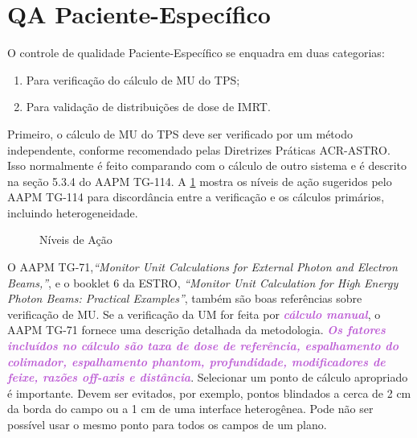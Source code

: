 \documentclass[11pt,a4paper]{article}
\newcounter{exemplo}
\begin{document}
\section{QA Paciente-Específico}

	O controle de qualidade Paciente-Específico se enquadra em duas categorias:

	\begin{enumerate}[label=\textcolor{CarnationPink}{\roman*.}]
		\item Para verificação do cálculo de MU do TPS;
		\item Para validação de distribuições de dose de IMRT.
	\end{enumerate}

	Primeiro, o cálculo de MU do TPS deve ser verificado por um método independente, conforme recomendado pelas Diretrizes Práticas ACR-ASTRO. Isso normalmente é feito comparando com o cálculo de outro sistema e é descrito na seção 5.3.4 do AAPM TG-114. A \ref{fig:niveisAcaoMu} mostra os níveis de ação sugeridos pelo AAPM TG-114 para discordância entre a verificação e os cálculos primários, incluindo heterogeneidade.
	
	\begin{figure}[h]
		\centering
		\caption{Níveis de Ação}
		\label{fig:niveisAcaoMu}
	\end{figure}

	O AAPM TG-71,\textit{``Monitor Unit Calculations for External Photon and Electron Beams,''}, e o booklet 6 da ESTRO, \textit{``Monitor Unit Calculation for High Energy Photon Beams: Practical Examples''}, também são boas referências sobre verificação de MU. Se a verificação da UM for feita por \textcolor{MediumOrchid}{\textbf{\textit{cálculo manual}}}, o AAPM TG-71 fornece uma descrição detalhada da metodologia. \textcolor{MediumOrchid}{\textbf{\textit{Os fatores incluídos no cálculo são taxa de dose de referência, espalhamento do colimador, espalhamento phantom, profundidade, modificadores de feixe, razões off-axis e distância}}}. Selecionar um ponto de cálculo apropriado é importante. Devem ser evitados, por exemplo, pontos blindados a cerca de 2 cm da borda do campo ou a 1 cm de uma interface heterogênea. Pode não ser possível usar o mesmo ponto para todos os campos de um plano.
\end{document}

